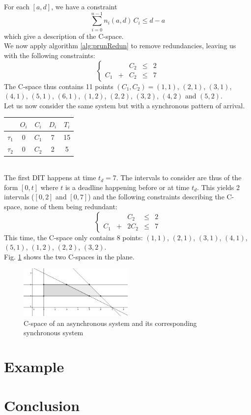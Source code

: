 \documentclass[times, 10pt,twocolumn, a4paper]{article}
\begin{document}
For each $[a, d]$, we have a constraint $$\sum_{i=0}^{n-1} n_i(a, d) \, C_i \leqslant d - a$$ which give a description of the C-space.\\

We now apply algorithm \ref{alg:prunRedun} to remove redundancies, leaving us with the following constraints:
$$
\left\{
	\begin{array}{ccccc}
		& & C_2 & \leqslant & 2 \\
		C_1 & + & C_2 & \leqslant & 7
	\end{array}
\right.
$$
The C-space thus contains 11 points $(C_1, C_2) = (1, 1)$, $(2, 1)$, $(3, 1)$, $(4, 1)$, $(5, 1)$, $(6, 1)$, $(1, 2)$, $(2, 2)$, $(3, 2)$, $(4, 2)$ and $(5, 2)$.\\

Let us now consider the same system but with a synchronous pattern of arrival.

		\begin{center}
		\begin{tabular}{|r|c|c|c|c|}
		 \hline
		  & $O_i$ & $C_i$ & $D_i$ & $T_i$ \\
		 \hline
		 $\tau_1$ & 0 & $C_1$ & 7 & 15\\
		 \hline
		 $\tau_2$ & 0 & $C_2$ & 2 & 5\\
		 \hline
		\end{tabular}
		\end{center}
		~\\

The first DIT happens at time $t_d = 7$. The intervals to consider are thus of the form $[0, t]$ where $t$ is a deadline happening before or at time $t_d$. This yields 2 intervals ($[0, 2]$ and $[0, 7]$) and the following constraints describing the C-space, none of them being redundant:
$$
\left\{
	\begin{array}{ccccc}
		& & C_2 & \leqslant & 2 \\
		C_1 & + & 2 C_2 & \leqslant & 7
	\end{array}
\right.
$$
This time, the C-space only contains 8 points: $(1, 1)$, $(2, 1)$, $(3, 1)$, $(4, 1)$, $(5, 1)$, $(1, 2)$, $(2, 2)$, $(3, 2)$.\\

Fig. \ref{fig:cspaceComp} shows the two C-spaces in the plane.

\begin{figure}[h]
\begin{center}
	\includegraphics[width=0.5\textwidth]{figs/cspace_example.png}
	\caption{C-space of an asynchronous system and its corresponding synchronous system}
	\label{fig:cspaceComp}
\end{center}
\end{figure}

\section{Example}

\section{Conclusion}



\end{document}
